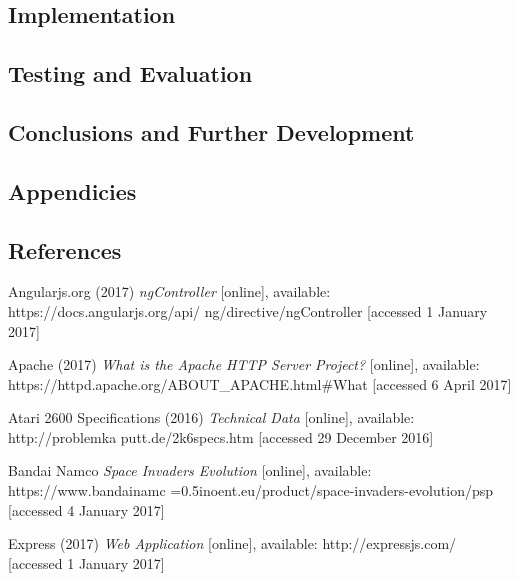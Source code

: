 \documentclass[12pt]{article}
\begin{document}
\begin{center}
\section{Implementation}
\end{center}

\begin{center}
\section{Testing and Evaluation}
\end{center}

\begin{center}
\section{Conclusions and Further Development}
\end{center}

\begin{center}
\section{Appendicies}
\end{center}

\begin{center}
\section{References}
\end{center}
Angularjs.org (2017) \textit{ngController} [online], available: https://docs.angularjs.org/api/
\hangindent=0.5in ng/directive/ngController [accessed 1 January 2017]

Apache (2017) \textit{What is the Apache HTTP Server Project?} [online], available: https://httpd.apache.org/ABOUT_APACHE.html#What [accessed 6 April 2017]

Atari 2600 Specifications (2016) \textit{Technical Data} [online], available: http://problemka
\hangindent=0.5in putt.de/2k6specs.htm [accessed 29 December 2016]

Bandai Namco \textit{Space Invaders Evolution} [online], available:
https://www.bandainamc
\hangindent=0.5inoent.eu/product/space-invaders-evolution/psp [accessed
4 January 2017]

Express (2017) \textit{Web Application} [online], available: http://expressjs.com/ [accessed 
\hangindent=0.5in 1 January 2017]
\end{document}
